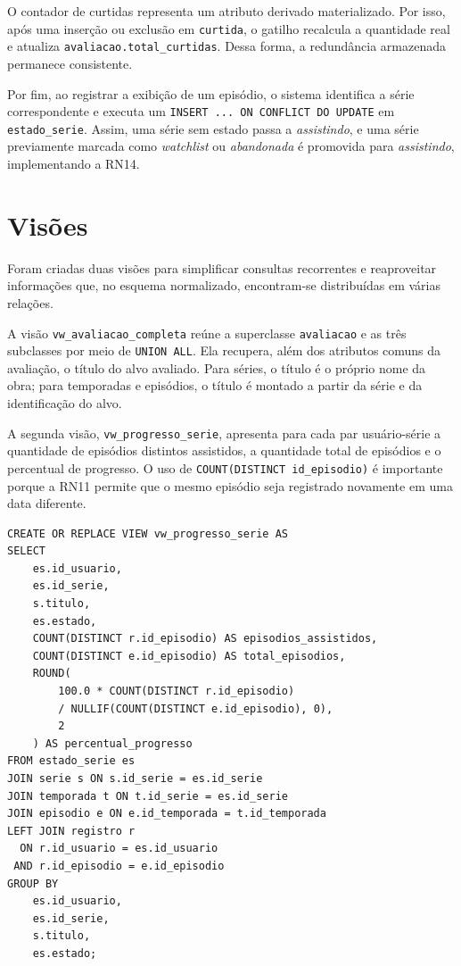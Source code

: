 \documentclass[a4paper,12pt,oneside,openany]{book}
\newcommand{\id}[1]{\texttt{#1}}
\begin{document}
O contador de curtidas representa um atributo derivado materializado. Por isso,
após uma inserção ou exclusão em \id{curtida}, o gatilho recalcula a quantidade
real e atualiza \id{avaliacao.total\_curtidas}. Dessa forma, a redundância
armazenada permanece consistente.

Por fim, ao registrar a exibição de um episódio, o sistema identifica a série
correspondente e executa um \id{INSERT ... ON CONFLICT DO UPDATE} em
\id{estado\_serie}. Assim, uma série sem estado passa a \textit{assistindo}, e
uma série previamente marcada como \textit{watchlist} ou \textit{abandonada}
é promovida para \textit{assistindo}, implementando a RN14.

\section{Visões}

Foram criadas duas visões para simplificar consultas recorrentes e reaproveitar
informações que, no esquema normalizado, encontram-se distribuídas em várias
relações.

A visão \id{vw\_avaliacao\_completa} reúne a superclasse
\id{avaliacao} e as três subclasses por meio de \id{UNION ALL}. Ela recupera,
além dos atributos comuns da avaliação, o título do alvo avaliado. Para séries,
o título é o próprio nome da obra; para temporadas e episódios, o título é
montado a partir da série e da identificação do alvo.

A segunda visão, \id{vw\_progresso\_serie}, apresenta para cada par
usuário-série a quantidade de episódios distintos assistidos, a quantidade total
de episódios e o percentual de progresso. O uso de
\id{COUNT(DISTINCT id\_episodio)} é importante porque a RN11 permite que o mesmo
episódio seja registrado novamente em uma data diferente.

\begin{lstlisting}[caption={Trecho da visão de progresso},label={lst:view-progresso}]
CREATE OR REPLACE VIEW vw_progresso_serie AS
SELECT
    es.id_usuario,
    es.id_serie,
    s.titulo,
    es.estado,
    COUNT(DISTINCT r.id_episodio) AS episodios_assistidos,
    COUNT(DISTINCT e.id_episodio) AS total_episodios,
    ROUND(
        100.0 * COUNT(DISTINCT r.id_episodio)
        / NULLIF(COUNT(DISTINCT e.id_episodio), 0),
        2
    ) AS percentual_progresso
FROM estado_serie es
JOIN serie s ON s.id_serie = es.id_serie
JOIN temporada t ON t.id_serie = es.id_serie
JOIN episodio e ON e.id_temporada = t.id_temporada
LEFT JOIN registro r
  ON r.id_usuario = es.id_usuario
 AND r.id_episodio = e.id_episodio
GROUP BY
    es.id_usuario,
    es.id_serie,
    s.titulo,
    es.estado;
\end{lstlisting}
\end{document}
